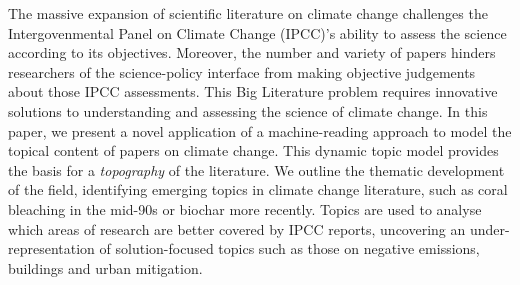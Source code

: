 \documentclass{article}
\begin{document}
	The massive expansion of scientific literature on climate change challenges the Intergovenmental Panel on Climate Change (IPCC)'s ability to assess the science according to its objectives.
	Moreover, the number and variety of papers hinders researchers of the science-policy interface from making objective judgements about those IPCC assessments. This Big Literature problem requires innovative solutions to understanding and assessing the science of climate change.
	In this paper, we present a novel application of a machine-reading approach to model the topical content of papers on climate change. This dynamic topic model provides the basis for a \textit{topography} of the literature. We outline the thematic development of the field, identifying emerging topics in climate change literature, such as coral bleaching in the mid-90s or biochar more recently. Topics are used to analyse which areas of research are better covered by IPCC reports, uncovering an under-representation of solution-focused topics such as those on negative emissions, buildings and urban mitigation.
\end{document}
